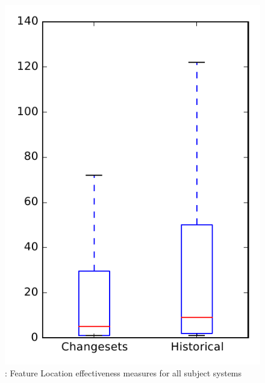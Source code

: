 
\begin{figure}
\centering
\includegraphics[height=0.4\textheight]{figures/flt/rq2_overview_no_outlier}
\caption{\ftwo: Feature Location effectiveness measures for all subject systems}
\label{fig:flt:rq2:overview}
\end{figure}
